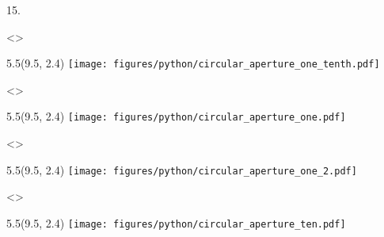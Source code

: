 \begin{textblock}{15.}
\end{textblock}

\def \ANGDISTX {9.5}
\def \ANGDISTY {2.4}
\def \ANGDISTWIDTH {5.5}

\visible<\SLIDERED>{
    \begin{textblock}{\ANGDISTWIDTH}(\ANGDISTX , \ANGDISTY)
        \texttt{[image: figures/python/circular\_aperture\_one\_tenth.pdf]}
    \end{textblock}
}
\visible<\SLIDEGREEN>{
    \begin{textblock}{\ANGDISTWIDTH}(\ANGDISTX , \ANGDISTY)
        \texttt{[image: figures/python/circular\_aperture\_one.pdf]}
    \end{textblock}
}
\visible<\SLIDEBLUE>{
    \begin{textblock}{\ANGDISTWIDTH}(\ANGDISTX , \ANGDISTY)
        \texttt{[image: figures/python/circular\_aperture\_one\_2.pdf]}
    \end{textblock}
}
\visible<\SLIDEVIOLET>{
    \begin{textblock}{\ANGDISTWIDTH}(\ANGDISTX , \ANGDISTY)
        \texttt{[image: figures/python/circular\_aperture\_ten.pdf]}
    \end{textblock}
}